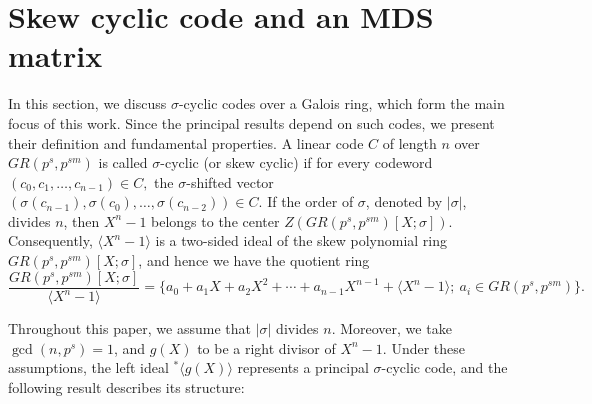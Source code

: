 \documentclass[11pt]{article}
\newtheorem{definition}{Definition}
\newtheorem{lemma}{Lemma}
\begin{document}


 
\section{Skew cyclic code and an MDS matrix}\label{Sec:Skew-cyclic-code}


In this section, we discuss $\sigma$-cyclic codes over a Galois ring, which form the main focus of this work. Since the principal results depend on such codes, we present their definition and fundamental properties. A linear code $C$ of length $n$ over $GR(p^s,p^{sm})$ is called $\sigma$-cyclic (or skew cyclic) if for every codeword  
\(
(c_0, c_1, \dots, c_{n-1}) \in C,
\)  
the $\sigma$-shifted vector  
\(
(\sigma(c_{n-1}), \sigma(c_0), \dots, \sigma(c_{n-2})) \in C.
\)  If the order of $\sigma$, denoted by $|\sigma|$, divides $n$, then $X^n-1$ belongs to the center $Z(GR(p^s,p^{sm})[X;\sigma])$. Consequently, $\langle X^n-1 \rangle$ is a two-sided ideal of the skew polynomial ring $GR(p^s,p^{sm})[X;\sigma]$, and hence we have   the quotient ring  
\[
\frac{GR(p^s,p^{sm})[X;\sigma]}{\langle X^n-1 \rangle}=\{a_0+a_1X+a_2X^2+\cdots+a_{n-1}X^{n-1}+\langle X^n-1 \rangle;~ a_i\in GR(p^s,p^{sm})\}.
\]  

Throughout this paper, we assume that $|\sigma|$ divides $n$. Moreover, we take $\gcd(n,p^s)=1$, and $g(X)$ to be a right divisor of $X^n-1$. Under these assumptions, the left ideal  
\(
^\ast\langle g(X)\rangle
\)  
represents a principal $\sigma$-cyclic code, and the following result describes its structure:
\end{document}
